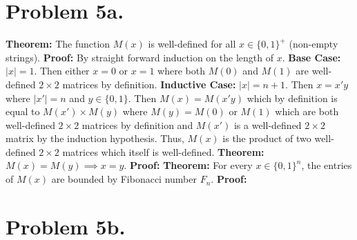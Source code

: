 \documentclass[12pt]{article}
\begin{document}
\pagestyle{plain}
\titleformat{\subsection}[runin]
  {\normalfont\large\bfseries}{\thesubsection}{1em}{}
\titleformat{\subsubsection}[runin]
  {\normalfont\large\bfseries}{\thesubsubsection}{1em}{}

\section*{Problem 5a.}
\textbf{Theorem:} The function $M(x)$ is well-defined for all $x\in\{0,1\}^+$
(non-empty strings).
\newline
\textbf{Proof:} By straight forward induction on the length of $x$.
\vspace{2mm}
\newline
\textbf{Base Case:} $|x| = 1$. Then either $x = 0$ or $x = 1$ where both
$M(0)$ and $M(1)$ are well-defined $2\times 2$ matrices by definition.
\vspace{2mm}
\newline
\textbf{Inductive Case:} $|x| = n + 1$. Then $x = x'y$ where $|x'| = n$ and
$y\in \{0,1\}$. Then $M(x) = M(x'y)$ which by definition is equal to
$M(x') \times M(y)$ where $M(y) = M(0) \text{ or } M(1)$ which are both
well-defined $2 \times 2$ matrices by definition and $M(x')$ is a well-defined
$2 \times 2$ matrix by the induction hypothesis. Thus, $M(x)$ is the product of
two well-defined $2 \times 2$ matrices which itself is well-defined.
\vspace{6mm}
\newline
\textbf{Theorem:} $M(x) = M(y) \implies x = y$.
\newline
\textbf{Proof:}
\vspace{6mm}
\newline
\textbf{Theorem:} For every $x \in \{0,1\}^n$, the entries of $M(x)$ are bounded
by Fibonacci number $F_n$.
\newline
\textbf{Proof:}
\section*{Problem 5b.}
\end{document}
